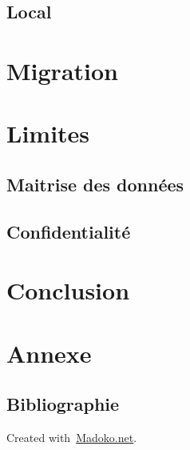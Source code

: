 \documentclass[11pt]{book}
\begin{document}
\subsection{Local}\label{sec-local}%

\section{Migration}\label{sec-migration}%

\section{Limites}\label{sec-limites}%

\subsection{Maitrise des données}\label{sec-maitrise-des-donnes}%

\subsection{Confidentialité}\label{sec-confidentialit}%

\section{Conclusion}\label{sec-conclusion}%

\section{Annexe}\label{sec-annexe}%

\subsection{Bibliographie}\label{sec-bibliographie}%

\begin{mdbmargintb}{4em}{}%
\begin{mdflushright}%
{\tiny{}Created with~\href{https://www.madoko.net}{Madoko.net}.}%
\end{mdflushright}%
\end{mdbmargintb}%
\end{document}
